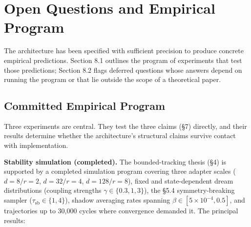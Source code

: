 \documentclass[11pt]{article}
\begin{document}
\section{Open Questions and Empirical Program}

The architecture has been specified with sufficient precision to produce concrete empirical predictions. Section 8.1 outlines the program of experiments that test those predictions; Section 8.2 flags deferred questions whose answers depend on running the program or that lie outside the scope of a theoretical paper.

\subsection{Committed Empirical Program}

Three experiments are central. They test the three claims (\S 7) directly, and their results determine whether the architecture's structural claims survive contact with implementation.

\textbf{Stability simulation (completed).} The bounded-tracking thesis (\S 4) is supported by a completed simulation program covering three adapter scales ($d = 8/r = 2$, $d = 32/r = 4$, $d = 128/r = 8$), fixed and state-dependent dream distributions (coupling strengths $\gamma \in \{0.3, 1, 3\}$), the \S 5.4 symmetry-breaking sampler ($\tau_\text{sb} \in \{1, 4\}$), shadow averaging rates spanning $\beta \in [5 \times 10^{-4}, 0.5]$, and trajectories up to 30{,}000 cycles where convergence demanded it. The principal results:
\end{document}
